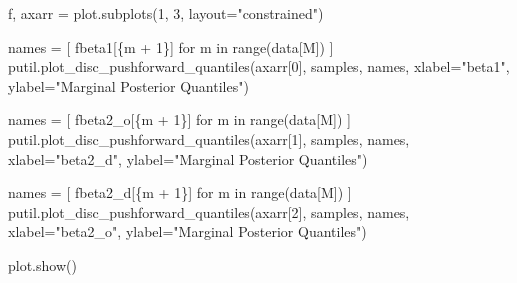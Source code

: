 \documentclass[
  letterpaper,
  DIV=11,
  numbers=noendperiod]{scrartcl}
\newenvironment{Shaded}{\begin{snugshade}}{\end{snugshade}}
\newcommand{\BuiltInTok}[1]{\textcolor[rgb]{0.00,0.23,0.31}{#1}}
\newcommand{\ControlFlowTok}[1]{\textcolor[rgb]{0.00,0.23,0.31}{#1}}
\newcommand{\DecValTok}[1]{\textcolor[rgb]{0.68,0.00,0.00}{#1}}
\newcommand{\KeywordTok}[1]{\textcolor[rgb]{0.00,0.23,0.31}{#1}}
\newcommand{\NormalTok}[1]{\textcolor[rgb]{0.00,0.23,0.31}{#1}}
\newcommand{\OperatorTok}[1]{\textcolor[rgb]{0.37,0.37,0.37}{#1}}
\newcommand{\SpecialCharTok}[1]{\textcolor[rgb]{0.37,0.37,0.37}{#1}}
\newcommand{\SpecialStringTok}[1]{\textcolor[rgb]{0.13,0.47,0.30}{#1}}
\newcommand{\StringTok}[1]{\textcolor[rgb]{0.13,0.47,0.30}{#1}}
\begin{document}
\begin{Shaded}
\begin{Highlighting}[]
\NormalTok{f, axarr }\OperatorTok{=}\NormalTok{ plot.subplots(}\DecValTok{1}\NormalTok{, }\DecValTok{3}\NormalTok{, layout}\OperatorTok{=}\StringTok{"constrained"}\NormalTok{)}

\NormalTok{names }\OperatorTok{=}\NormalTok{ [ }\SpecialStringTok{f\textquotesingle{}beta1[}\SpecialCharTok{\{}\NormalTok{m }\OperatorTok{+} \DecValTok{1}\SpecialCharTok{\}}\SpecialStringTok{]\textquotesingle{}} \ControlFlowTok{for}\NormalTok{ m }\KeywordTok{in} \BuiltInTok{range}\NormalTok{(data[}\StringTok{\textquotesingle{}M\textquotesingle{}}\NormalTok{]) ]}
\NormalTok{putil.plot\_disc\_pushforward\_quantiles(axarr[}\DecValTok{0}\NormalTok{], samples, names,}
\NormalTok{                                      xlabel}\OperatorTok{=}\StringTok{"beta1"}\NormalTok{,}
\NormalTok{                                      ylabel}\OperatorTok{=}\StringTok{"Marginal Posterior Quantiles"}\NormalTok{)}

\NormalTok{names }\OperatorTok{=}\NormalTok{ [ }\SpecialStringTok{f\textquotesingle{}beta2\_o[}\SpecialCharTok{\{}\NormalTok{m }\OperatorTok{+} \DecValTok{1}\SpecialCharTok{\}}\SpecialStringTok{]\textquotesingle{}} \ControlFlowTok{for}\NormalTok{ m }\KeywordTok{in} \BuiltInTok{range}\NormalTok{(data[}\StringTok{\textquotesingle{}M\textquotesingle{}}\NormalTok{]) ]}
\NormalTok{putil.plot\_disc\_pushforward\_quantiles(axarr[}\DecValTok{1}\NormalTok{], samples, names,}
\NormalTok{                                      xlabel}\OperatorTok{=}\StringTok{"beta2\_d"}\NormalTok{,}
\NormalTok{                                      ylabel}\OperatorTok{=}\StringTok{"Marginal Posterior Quantiles"}\NormalTok{)}

\NormalTok{names }\OperatorTok{=}\NormalTok{ [ }\SpecialStringTok{f\textquotesingle{}beta2\_d[}\SpecialCharTok{\{}\NormalTok{m }\OperatorTok{+} \DecValTok{1}\SpecialCharTok{\}}\SpecialStringTok{]\textquotesingle{}} \ControlFlowTok{for}\NormalTok{ m }\KeywordTok{in} \BuiltInTok{range}\NormalTok{(data[}\StringTok{\textquotesingle{}M\textquotesingle{}}\NormalTok{]) ]}
\NormalTok{putil.plot\_disc\_pushforward\_quantiles(axarr[}\DecValTok{2}\NormalTok{], samples, names,}
\NormalTok{                                      xlabel}\OperatorTok{=}\StringTok{"beta2\_o"}\NormalTok{,}
\NormalTok{                                      ylabel}\OperatorTok{=}\StringTok{"Marginal Posterior Quantiles"}\NormalTok{)}

\NormalTok{plot.show()}
\end{Highlighting}
\end{Shaded}
\end{document}
